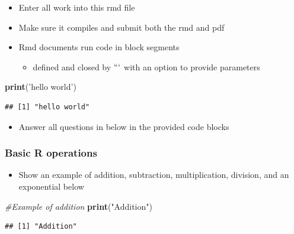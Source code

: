 \documentclass[]{article}
\newenvironment{Shaded}{\begin{snugshade}}{\end{snugshade}}
\newcommand{\CommentTok}[1]{\textcolor[rgb]{0.56,0.35,0.01}{\textit{#1}}}
\newcommand{\KeywordTok}[1]{\textcolor[rgb]{0.13,0.29,0.53}{\textbf{#1}}}
\newcommand{\NormalTok}[1]{#1}
\newcommand{\StringTok}[1]{\textcolor[rgb]{0.31,0.60,0.02}{#1}}
\providecommand{\tightlist}{%
  \setlength{\itemsep}{0pt}\setlength{\parskip}{0pt}}
\begin{document}
\begin{itemize}
\tightlist
\item
  Enter all work into this rmd file
\item
  Make sure it compiles and submit both the rmd and pdf
\item
  Rmd documents run code in block segments

  \begin{itemize}
  \tightlist
  \item
    defined and closed by \(```\) with an option to provide parameters
  \end{itemize}
\end{itemize}

\begin{Shaded}
\begin{Highlighting}[]
\KeywordTok{print}\NormalTok{(}\StringTok{'hello world'}\NormalTok{)}
\end{Highlighting}
\end{Shaded}

\begin{verbatim}
## [1] "hello world"
\end{verbatim}

\begin{itemize}
\tightlist
\item
  Answer all questions in below in the provided code blocks
\end{itemize}

\hypertarget{basic-r-operations}{%
\subsubsection{Basic R operations}\label{basic-r-operations}}

\begin{itemize}
\tightlist
\item
  Show an example of addition, subtraction, multiplication, division,
  and an exponential below
\end{itemize}

\begin{Shaded}
\begin{Highlighting}[]
\CommentTok{#Example of addition}
\KeywordTok{print}\NormalTok{(}\StringTok{"Addition"}\NormalTok{)}
\end{Highlighting}
\end{Shaded}

\begin{verbatim}
## [1] "Addition"
\end{verbatim}
\end{document}
